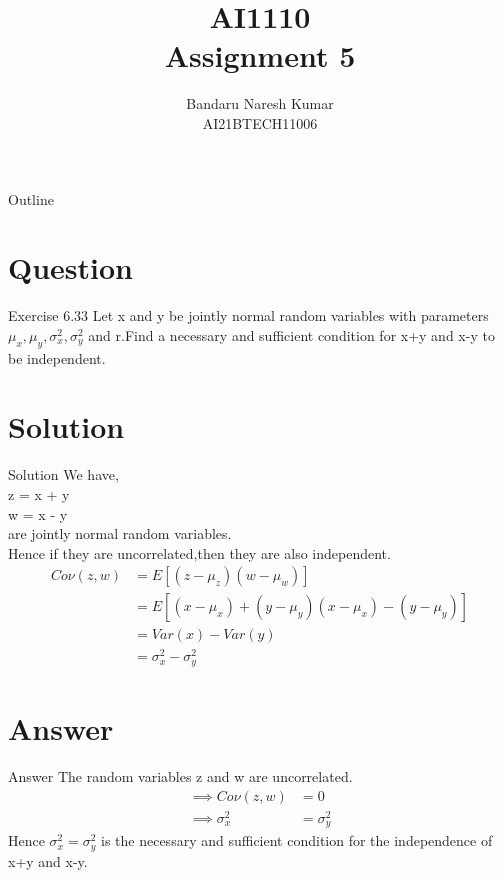 \documentclass{beamer}
\title{AI1110 \\ Assignment 5}
\author{Bandaru Naresh Kumar \\ AI21BTECH11006}
\date{}
\begin{document}
	\begin{frame}
		\titlepage
	\end{frame}
	
	\begin{frame}{Outline}
    		\tableofcontents
	\end{frame}
	
	\section{Question}
	\begin{frame}{Exercise 6.33}
	Let x and y be jointly normal random variables with parameters $\mu_x,\mu_y,\sigma_x^2,\sigma_y^2$ and r.Find a necessary and sufficient condition for x+y and x-y to be independent.\\
	\end{frame}
	
	\section{Solution}
	\begin{frame}{Solution}
	We have,\\
	   z = x + y\\
	   w = x - y\\
	   are jointly normal random variables.\\
	Hence if they are uncorrelated,then they are also independent.\\
	\begin{align}
	    Co\nu(z,w) &= E[(z-\mu_z)(w-\mu_w)]\\
	               &= E[{(x-\mu_x)+(y-\mu_y)}{(x-\mu_x)-(y-\mu_y)}]\\
	               &= Var(x)-Var(y)\\
	               &= \sigma_x^2 - \sigma_y^2
	\end{align}
	\end{frame}
	
	\section{Answer}
	\begin{frame}{Answer}
	   The random variables z and w are uncorrelated.
	   \begin{align}
	       \implies Co\nu(z,w) &= 0\\
	       \implies \sigma_x^2 &= \sigma_y^2
	   \end{align}
	   Hence $\sigma_x^2 = \sigma_y^2$ is the necessary and sufficient condition for the independence of x+y and x-y.\\
	\end{frame}
	
\end{document}
